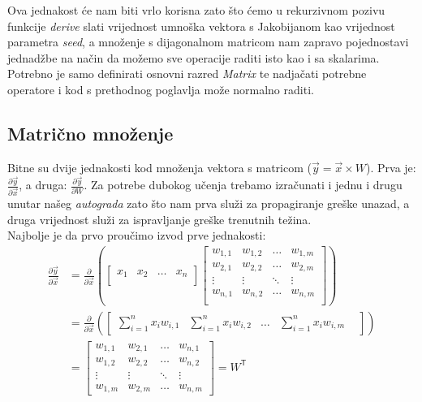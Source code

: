 \documentclass[zavrsnirad]{fer}
\begin{document}
Ova jednakost će nam biti vrlo korisna zato što ćemo u rekurzivnom pozivu funkcije \textit{derive} slati vrijednost umnoška vektora s Jakobijanom kao vrijednost parametra \textit{seed}, a množenje s dijagonalnom matricom nam zapravo pojednostavi jednadžbe na način da možemo sve operacije raditi isto kao i sa skalarima. Potrebno je samo definirati osnovni razred \textit{Matrix} te nadjačati potrebne operatore i kod s prethodnog poglavlja može normalno raditi.



\subsection{Matrično množenje}
Bitne su dvije jednakosti kod množenja vektora s matricom ($\vec{y} = \vec{x} \times W$). Prva je: $\frac{\partial \vec{y}}{\partial \vec{x}}$, a druga: $\frac{\partial \vec{y}}{\partial W}$. Za potrebe dubokog učenja trebamo izračunati i jednu i drugu unutar našeg \textit{autograda} zato što nam prva služi za propagiranje greške unazad, a druga vrijednost služi za ispravljanje greške trenutnih težina.
\\
Najbolje je da prvo proučimo izvod prve jednakosti:
\begin{align*}
  \frac{\partial \vec{y}}{\partial \vec{x}} &=
  \frac{\partial}{\partial \vec{x}}
  \left(
  \begin{bmatrix}
    x_1 & x_2 & \dots & x_n \\
  \end{bmatrix}
  \begin{bmatrix}
    w_{1,1} & w_{1,2} & \dots & w_{1,m} \\
    w_{2,1} & w_{2,2} & \dots & w_{2,m} \\
    \vdots & \vdots & \ddots & \vdots \\
    w_{n,1} & w_{n,2} & \dots & w_{n,m} \\
  \end{bmatrix}
  \right)\\
  &=
  \frac{\partial}{\partial \vec{x}}
  \left(
  \begin{bmatrix}
    \sum_{i=1}^{n} x_i w_{i,1} &
    \sum_{i=1}^{n} x_i w_{i,2} &
    \dots &
    \sum_{i=1}^{n} x_i w_{i,m} &
  \end{bmatrix}
  \right)\\
  &=
  \begin{bmatrix}
    w_{1,1} & w_{2,1} & \dots & w_{n,1} \\
    w_{1,2} & w_{2,2} & \dots & w_{n,2} \\
    \vdots & \vdots & \ddots & \vdots \\
    w_{1,m} & w_{2,m} & \dots & w_{n,m}
  \end{bmatrix}
    = W^\mathsf{T}
\end{align*}
\end{document}
